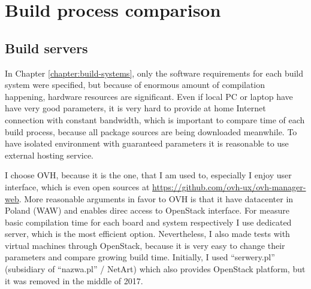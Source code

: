 \documentclass[printmode]{mgr}
\begin{document}
\begin{landscape}








\end{landscape}



















\chapter{Build process comparison}
\label{chapter:build-comparison}

\section{Build servers}
In Chapter \ref{chapter:build-systems}, only the software requirements for each build system were specified, but because of enormous amount of compilation happening, hardware resources are significant.
Even if local PC or laptop have have very good parameters, it is very hard to provide at home Internet connection with constant bandwidth, which is important to compare time of each build process, because all package sources are being downloaded meanwhile.
To have isolated environment with guaranteed parameters it is reasonable to use external hosting service.

I choose OVH, because it is the one, that I am used to, especially I enjoy user interface, which is even open sources at \url{https://github.com/ovh-ux/ovh-manager-web}.
More reasonable arguments in favor to OVH is that it have datacenter in Poland (WAW) and enables direc access to OpenStack interface.
For measure basic compilation time for each board and system respectively I use dedicated server, which is the most efficient option.
Nevertheless, I also made tests with virtual machines through OpenStack, because it is very easy to change their parameters and compare growing build time.
Initially, I used ``serwery.pl'' (subsidiary of ``nazwa.pl'' / NetArt) which also provides OpenStack platform, but it was removed in the middle of 2017.
\end{document}
